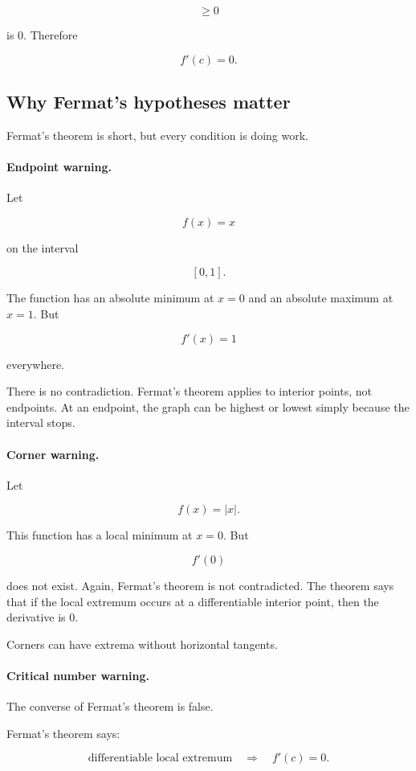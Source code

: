 \[
\ge 0
\]

is \(0\).  Therefore

\[
f'(c)=0.
\]

\subsection{Why Fermat's hypotheses matter}
\label{subsec:fermat-hypotheses-matter}

Fermat's theorem is short, but every condition is doing work.

\paragraph{Endpoint warning.}
Let

\[
f(x)=x
\]

on the interval

\[
[0,1].
\]

The function has an absolute minimum at \(x=0\) and an absolute maximum at \(x=1\).
But

\[
f'(x)=1
\]

everywhere.

There is no contradiction.  Fermat's theorem applies to interior points, not endpoints.
At an endpoint, the graph can be highest or lowest simply because the interval stops.

\paragraph{Corner warning.}
Let

\[
f(x)=|x|.
\]

This function has a local minimum at \(x=0\).  But

\[
f'(0)
\]

does not exist.  Again, Fermat's theorem is not contradicted.  The theorem says that
if the local extremum occurs at a differentiable interior point, then the derivative
is \(0\).

Corners can have extrema without horizontal tangents.

\paragraph{Critical number warning.}
The converse of Fermat's theorem is false.

Fermat's theorem says:

\[
\text{differentiable local extremum}
\quad\Longrightarrow\quad
f'(c)=0.
\]


